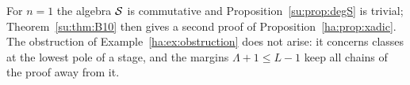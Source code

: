 For \(n=1\) the algebra \(\mathcal S\) is commutative and
Proposition~\ref{su:prop:degS} is trivial; Theorem~\ref{su:thm:B10} then
gives a second proof of Proposition~\ref{ha:prop:xadic}. The obstruction
of Example~\ref{ha:ex:obstruction} does not arise: it concerns classes at
the lowest pole of a stage, and the margins \(\Lambda+1\le L-1\) keep all
chains of the proof away from it.
